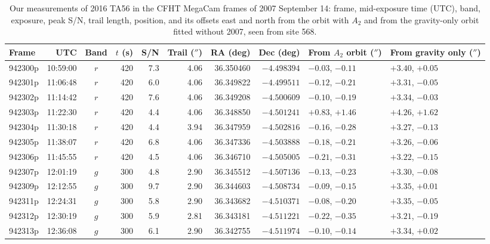 \documentclass[3p,11pt]{elsarticle}
\begin{document}
\begin{table}[tbp]
\centering\small
\caption{Our measurements of 2016 TA56 in the CFHT MegaCam frames of 2007 September 14:
frame, mid-exposure time (UTC), band, exposure, peak S/N, trail length, position, and its
offsets east and north from the orbit with $A_2$ and from the gravity-only orbit fitted
without 2007, seen from site 568.}
\label{tab:cfht}
\begin{adjustbox}{max width=\textwidth}
\begin{tabular}{lrcrrrrrll}
\toprule
Frame & UTC & Band & $t$ (s) & S/N & Trail ($''$) & RA (deg) & Dec (deg) & From $A_2$ orbit ($''$) & From gravity only ($''$) \\
\midrule
942300p & 10:59:00 & $r$ & 420 & 7.3 & 4.06 & 36.350460 & $-4.498394$ & $-0.03$, $-0.11$ & $+3.40$, $+0.05$ \\
942301p & 11:06:48 & $r$ & 420 & 6.0 & 4.06 & 36.349822 & $-4.499511$ & $-0.12$, $-0.21$ & $+3.31$, $-0.05$ \\
942302p & 11:14:42 & $r$ & 420 & 7.6 & 4.06 & 36.349208 & $-4.500609$ & $-0.10$, $-0.19$ & $+3.34$, $-0.03$ \\
942303p & 11:22:30 & $r$ & 420 & 4.4 & 4.06 & 36.348850 & $-4.501241$ & $+0.83$, $+1.46$ & $+4.26$, $+1.62$ \\
942304p & 11:30:18 & $r$ & 420 & 4.4 & 3.94 & 36.347959 & $-4.502816$ & $-0.16$, $-0.28$ & $+3.27$, $-0.13$ \\
942305p & 11:38:07 & $r$ & 420 & 6.8 & 4.06 & 36.347336 & $-4.503888$ & $-0.18$, $-0.21$ & $+3.26$, $-0.06$ \\
942306p & 11:45:55 & $r$ & 420 & 4.5 & 4.06 & 36.346710 & $-4.505005$ & $-0.21$, $-0.31$ & $+3.22$, $-0.15$ \\
942307p & 12:01:19 & $g$ & 300 & 4.8 & 2.90 & 36.345512 & $-4.507136$ & $-0.13$, $-0.23$ & $+3.30$, $-0.08$ \\
942309p & 12:12:55 & $g$ & 300 & 9.7 & 2.90 & 36.344603 & $-4.508734$ & $-0.09$, $-0.15$ & $+3.35$, $+0.01$ \\
942311p & 12:24:31 & $g$ & 300 & 5.8 & 2.90 & 36.343682 & $-4.510371$ & $-0.08$, $-0.20$ & $+3.35$, $-0.05$ \\
942312p & 12:30:19 & $g$ & 300 & 5.9 & 2.81 & 36.343181 & $-4.511221$ & $-0.22$, $-0.35$ & $+3.21$, $-0.19$ \\
942313p & 12:36:08 & $g$ & 300 & 6.1 & 2.90 & 36.342755 & $-4.511974$ & $-0.10$, $-0.14$ & $+3.34$, $+0.02$ \\
\bottomrule
\end{tabular}
\end{adjustbox}
\end{table}
\end{document}
